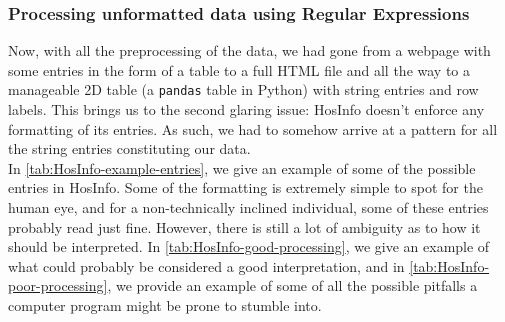 \subsubsection*{Processing unformatted data using Regular Expressions}
Now, with all the preprocessing of the data, we had gone from a webpage with some entries in the form of a table to a full HTML file and all the way to a manageable 2D table (a \texttt{pandas} table in Python) with string entries and row labels. This brings us to the second glaring issue: HosInfo doesn't enforce any formatting of its entries. As such, we had to somehow arrive at a pattern for all the string entries constituting our data.
\\
In \autoref{tab:HosInfo-example-entries}, we give an example of some of the possible entries in HosInfo. Some of the formatting is extremely simple to spot for the human eye, and for a non-technically inclined individual, some of these entries probably read just fine. However, there is still a lot of ambiguity as to how it should be interpreted. In \autoref{tab:HosInfo-good-processing}, we give an example of what could probably be considered a good interpretation, and in \autoref{tab:HosInfo-poor-processing}, we provide an example of some of all the possible pitfalls a computer program might be prone to stumble into.  

